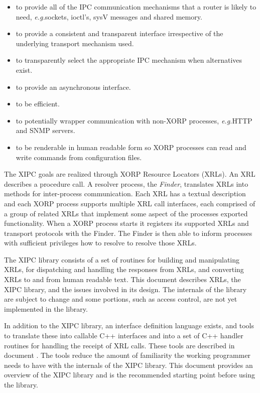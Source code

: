 \documentclass[11pt]{article}
\newcommand{\eg}{\emph{e.g.\/}} %
\begin{document}
\begin{itemize}

\item to provide all of the IPC communication mechanisms that a router is
likely to need, \eg sockets, ioctl's, sysV messages and shared memory.

\item to provide a consistent and transparent interface irrespective
of the underlying transport mechanism used.

\item to transparently select the appropriate IPC mechanism when
alternatives exist.

\item to provide an asynchronous interface.

\item to be efficient.

\item to potentially wrapper communication with non-XORP processes,
\eg HTTP and SNMP servers.

\item to be renderable in human readable form so XORP processes can
read and write commands from configuration files.

\end{itemize}

The XIPC goals are realized through XORP Resource Locators (XRLs).  An
XRL describes a procedure call.  A resolver process, the
\emph{Finder}, translates XRLs into methods for inter-process
communication.  Each XRL has a textual description and each XORP
process supports multiple XRL call interfaces, each comprised of a
group of related XRLs that implement some aspect of the processes
exported functionality.  When a XORP process starts it registers its
supported XRLs and transport protocols with the Finder.  The Finder is
then able to inform processes with sufficient privileges how to
resolve to resolve those XRLs.

The XIPC library consists of a set of routines for building and
manipulating XRLs, for dispatching and handling the responses from
XRLs, and converting XRLs to and from human readable text.  This
document describes XRLs, the XIPC library, and the issues involved in
its design.  The internals of the library are subject to change and
some portions, such as access control, are not yet implemented in the
library.

In addition to the XIPC library, an interface definition language
exists, and tools to translate these into callable C++ interfaces and
into a set of C++ handler routines for handling the receipt of XRL
calls.  These tools are described in document \cite{xorp:xrl_interfaces}.
The tools reduce 
the amount of familiarity the working programmer needs to have with the
internals of the XIPC library.  This document provides an overview of
the XIPC library and is the recommended starting point before using
the library.
\end{document}
